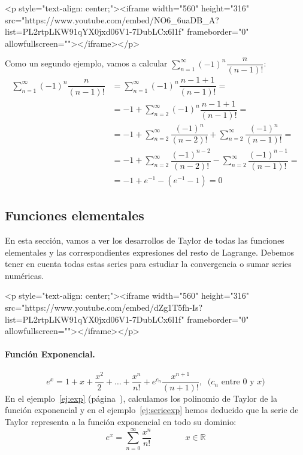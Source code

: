 \begin{rawhtml}
<p style="text-align: center;"><iframe width="560" height="316" src="https://www.youtube.com/embed/NO6_6uaDB_A?list=PL2rtpLKW91qYX0jxd06V1-7DubLCx6l1f" frameborder="0" allowfullscreen=""></iframe></p>
\end{rawhtml}
\begin{ejemplo}
Como un segundo ejemplo, vamos a calcular $\displaystyle\sum_{n=1}^\infty  (-1)^n\dfrac{n}{(n-1)!}$:
\begin{align*}
\displaystyle\sum_{n=1}^\infty  (-1)^n\dfrac{n}{(n-1)!} &= \displaystyle\sum_{n=1}^\infty  (-1)^n\dfrac{n-1+1}{(n-1)!} =\\
&= -1+\displaystyle\sum_{n=2}^\infty  (-1)^n\dfrac{n-1+1}{(n-1)!} =\\
&= -1+\displaystyle\sum_{n=2}^\infty  \dfrac{(-1)^n}{(n-2)!}+\displaystyle\sum_{n=2}^\infty  \dfrac{(-1)^n}{(n-1)!} =\\
&= -1+\displaystyle\sum_{n=2}^\infty  \dfrac{(-1)^{n-2}}{(n-2)!}-\displaystyle\sum_{n=2}^\infty  \dfrac{(-1)^{n-1}}{(n-1)!} =\\
&= -1+e^{-1}-(e^{-1}-1) = 0
\end{align*}
\end{ejemplo}

\subsection{Funciones elementales}\label{ss:funel}

En esta sección, vamos a ver los desarrollos de Taylor de todas las funciones elementales y las correspondientes expresiones del resto de Lagrange.
Debemos tener en cuenta todas estas series para estudiar la convergencia o sumar series numéricas.

\begin{rawhtml}
<p style="text-align: center;"><iframe width="560" height="316" src="https://www.youtube.com/embed/dZg1T5fh-Is?list=PL2rtpLKW91qYX0jxd06V1-7DubLCx6l1f" frameborder="0" allowfullscreen=""></iframe></p>
\end{rawhtml}

\paragraph{Función Exponencial.}
\[
e^x=1+x+\frac{x^2}{2}+\dots+\frac{x^n}{n!}+e^{c_n}\frac{x^{n+1}}{(n+1)!},\ 
\text{ ($c_n$ entre $0$ y $x$)}
\]
En el ejemplo~\ref{ej:exp} (página~\pageref{ej:exp}), calculamos los polinomio de Taylor de la función exponencial y en el ejemplo~\ref{ej:serieexp} hemos deducido que la serie de Taylor representa a la función exponencial en todo su dominio:
\[
e^x=\displaystyle\sum_{n=0}^\infty   \frac{x^n}{n!}\qquad\qquad x\in\mathbb{R}
\]

